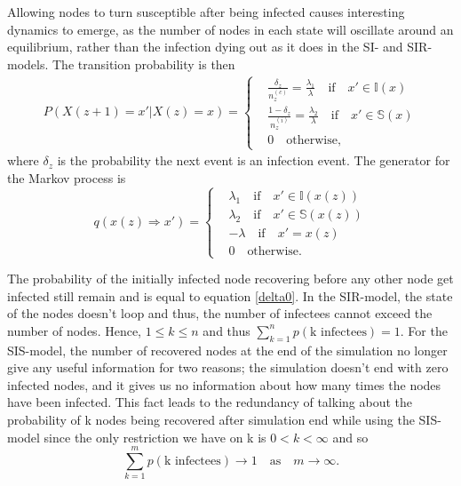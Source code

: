 \documentclass[12pt]{article} %
\numberwithin{equation}{section}
\begin{document}
Allowing nodes to turn susceptible after being infected causes interesting dynamics to emerge, as the number of nodes in each state will oscillate around an equilibrium, rather than the infection dying out as it does in the SI- and SIR-models. The transition probability is then
\begin{equation} \label{firstPSIS}
\begin{split}
P(X(z+1) = x' |X(z)= x) =
\begin{cases}
& \frac{\delta_z}{n_z^{(c)}}=\frac{\lambda_1}{\lambda}  \quad \text{if} \quad x' \in \mathbb{I}(x) \\
& \frac{1-\delta_z}{n_z^{(i)}}=\frac{\lambda_2}{\lambda}  \quad \text{if} \quad x' \in \mathbb{S}(x) \\
& 0 \quad \text{otherwise,}
\end{cases}
\end{split}
\end{equation}
where $\delta_z$ is the probability the next event is an infection event.
The generator for the Markov process is
\begin{equation}\label{qSIS}
    q(x(z)\Rightarrow x') = 
    \begin{cases}
    & \lambda_1 \quad \text{if} \quad x' \in \mathbb{I}(x(z)) \\
     & \lambda_2 \quad \text{if} \quad x' \in \mathbb{S}(x(z)) \\
    & -\lambda   \quad \text{if} \quad x' = x(z)\\
    & 0 \quad \text{otherwise.}
    \end{cases}
\end{equation}

The probability of the initially infected node recovering before any other node get infected still remain and is equal to equation \ref{delta0}. In the SIR-model, the state of the nodes doesn't loop and thus, the number of infectees cannot exceed the number of nodes. Hence, $1 \leq k\leq n$ and thus $\sum^n_{k=1} p(\text{k infectees}) = 1$. For the SIS-model, the number of recovered nodes at the end of the simulation no longer give any useful information for two reasons; the simulation doesn't end with zero infected nodes, and it gives us no information about how many times the nodes have been infected. This fact leads to the redundancy of talking about the probability of k nodes being recovered after simulation end while using the SIS-model since the only restriction we have on k is $0< k < \infty$ and so
\begin{equation}
    \sum^m_{k = 1} p(\text{k infectees}) \rightarrow 1 \quad \text{as} \quad m \rightarrow \infty.
\end{equation}
\end{document}
